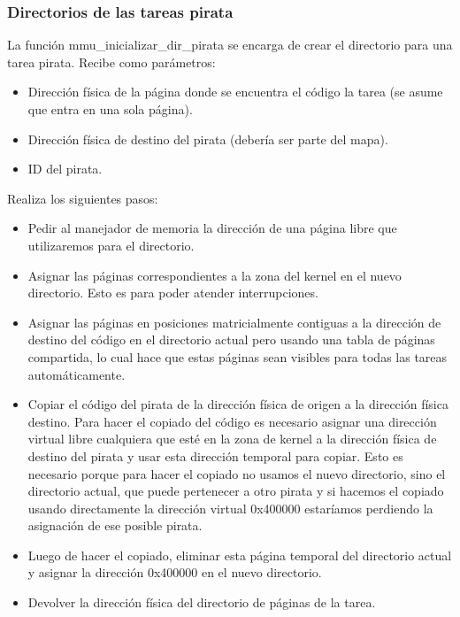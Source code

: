\subsubsection{Directorios de las tareas pirata}
La función mmu\_inicializar\_dir\_pirata se encarga de crear el directorio para una tarea pirata.\newline
Recibe como parámetros:
\begin{itemize}
\item Dirección física de la página donde se encuentra el código la tarea (se asume que entra en una sola página).
\item Dirección física de destino del pirata (debería ser parte del mapa).
\item ID del pirata.
\end{itemize}
Realiza los siguientes pasos:
\begin{itemize}
\item Pedir al manejador de memoria la dirección de una página libre que utilizaremos para el directorio.
\item Asignar las páginas correspondientes a la zona del kernel en el nuevo directorio. Esto es para poder atender interrupciones.
\item Asignar las páginas en posiciones matricialmente contiguas a la dirección de destino del código en el directorio actual pero usando una tabla de páginas compartida, lo cual hace que estas páginas sean visibles para todas las tareas automáticamente.
\item Copiar el código del pirata de la dirección física de origen a la dirección física destino. Para hacer el copiado del código es necesario asignar una dirección virtual libre cualquiera que esté en la zona de kernel a la dirección física de destino del pirata y usar esta dirección temporal para copiar. Esto es necesario porque para hacer el copiado no usamos el nuevo directorio, sino el directorio actual, que puede pertenecer a otro pirata y si hacemos el copiado usando directamente la dirección virtual 0x400000 estaríamos perdiendo la asignación de ese posible pirata.
\item Luego de hacer el copiado, eliminar esta página temporal del directorio actual y asignar la dirección 0x400000 en el nuevo directorio.
\item Devolver la dirección física del directorio de páginas de la tarea.
\end{itemize}
